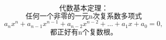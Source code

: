 \documentclass[preview]{standalone}
\begin{document}
\centering
$$\text{代数基本定理：}$$$$\text{任何一个非零的一元n次复系数多项式}$$$$a_{n}x^{n}+a_{n-1} x^{n-1}+a_{n-2} x^{n-2}+\ldots+a_{1} x+a_{0}=0,$$$$\text{都正好有n个复数根。}$$
\end{document}
